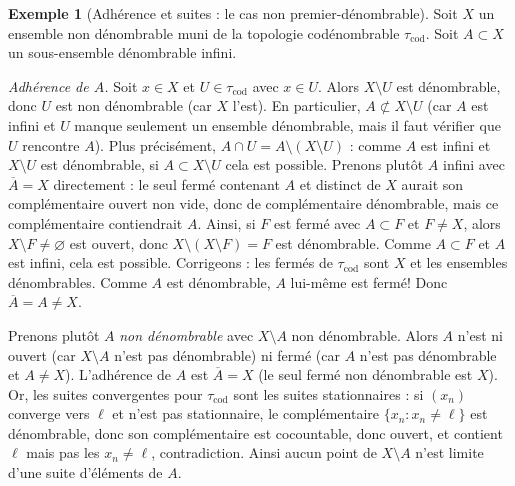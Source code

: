 \documentclass[12pt,a4paper,openany]{book}
\theoremstyle{definition}
\theoremstyle{cours}
\theoremstyle{coursnormal}
\newtheorem{exemple}[theoreme]{Exemple}
\newcommand{\Cl}[1]{\overline{#1}}
\begin{document}
\begin{exemple}[Adhérence et suites : le cas non premier-dénombrable]\label{ex:adherence-non-sequentielle}
  Soit $X$ un ensemble non dénombrable muni de la topologie codénombrable $\tau_{\mathrm{cod}}$. Soit $A \subset X$ un sous-ensemble dénombrable infini.

  \emph{Adhérence de $A$.} Soit $x \in X$ et $U \in \tau_{\mathrm{cod}}$ avec $x \in U$. Alors $X \setminus U$ est dénombrable, donc $U$ est non dénombrable (car $X$ l'est). En particulier, $A \not\subset X \setminus U$ (car $A$ est infini et $U$ manque seulement un ensemble dénombrable, mais il faut vérifier que $U$ rencontre $A$). Plus précisément, $A \cap U = A \setminus (X \setminus U)$ : comme $A$ est infini et $X \setminus U$ est dénombrable, si $A \subset X \setminus U$ cela est possible. Prenons plutôt $A$ infini avec $\Cl{A} = X$ directement : le seul fermé contenant $A$ et distinct de $X$ aurait son complémentaire ouvert non vide, donc de complémentaire dénombrable, mais ce complémentaire contiendrait $A$. Ainsi, si $F$ est fermé avec $A \subset F$ et $F \neq X$, alors $X \setminus F \neq \varnothing$ est ouvert, donc $X \setminus (X \setminus F) = F$ est dénombrable. Comme $A \subset F$ et $A$ est infini, cela est possible. Corrigeons : les fermés de $\tau_{\mathrm{cod}}$ sont $X$ et les ensembles dénombrables. Comme $A$ est dénombrable, $A$ lui-même est fermé! Donc $\Cl{A} = A \neq X$.

  Prenons plutôt $A$ \emph{non dénombrable} avec $X \setminus A$ non dénombrable. Alors $A$ n'est ni ouvert (car $X \setminus A$ n'est pas dénombrable) ni fermé (car $A$ n'est pas dénombrable et $A \neq X$). L'adhérence de $A$ est $\Cl{A} = X$ (le seul fermé non dénombrable est $X$). Or, les suites convergentes pour $\tau_{\mathrm{cod}}$ sont les suites stationnaires : si $(x_n)$ converge vers $\ell$ et n'est pas stationnaire, le complémentaire $\{x_n : x_n \neq \ell\}$ est dénombrable, donc son complémentaire est cocountable, donc ouvert, et contient $\ell$ mais pas les $x_n \neq \ell$, contradiction. Ainsi aucun point de $X \setminus A$ n'est limite d'une suite d'éléments de $A$.
\end{exemple}
\end{document}
